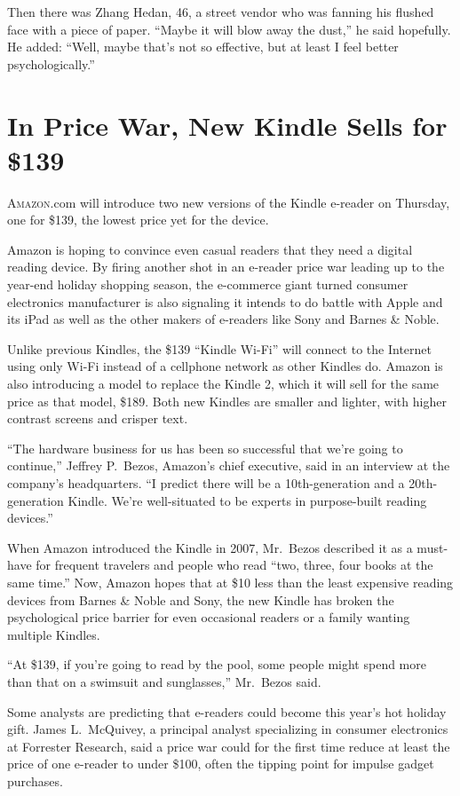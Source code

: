 ﻿\documentclass[12pt]{article}
\begin{document}
Then there was Zhang Hedan, 46, a street vendor who was fanning his flushed face with a piece of
paper. ``Maybe it will blow away the dust,'' he said hopefully. He added: ``Well, maybe that's not
so effective, but at least I feel better psychologically.''

\section{In Price War, New Kindle Sells for \$139}

\lettrine{A}{mazon}.com will introduce two new versions of the Kindle
e-reader on Thursday, one for \$139, the lowest price yet for the device.

Amazon is hoping to convince even casual readers that they need a digital reading device. By firing
another shot in an e-reader price war leading up to the year-end holiday shopping season, the
e-commerce giant turned consumer electronics manufacturer is also signaling it intends to do battle
with Apple and its iPad as well as the other makers of e-readers like Sony and Barnes \& Noble.

Unlike previous Kindles, the \$139 ``Kindle Wi-Fi'' will connect to the Internet using only Wi-Fi
instead of a cellphone network as other Kindles do. Amazon is also introducing a model to replace
the Kindle 2, which it will sell for the same price as that model, \$189. Both new Kindles are
smaller and lighter, with higher contrast screens and crisper text.

``The hardware business for us has been so successful that we're going to continue,'' Jeffrey
P.~Bezos, Amazon's chief executive, said in an interview at the company's headquarters. ``I predict
there will be a 10th-generation and a 20th-generation Kindle. We're well-situated to be experts in
purpose-built reading devices.''

When Amazon introduced the Kindle in 2007, Mr.~Bezos described it as a must-have for frequent
travelers and people who read ``two, three, four books at the same time.'' Now, Amazon hopes that at
\$10 less than the least expensive reading devices from Barnes \& Noble and Sony, the new Kindle has
broken the psychological price barrier for even occasional readers or a family wanting multiple
Kindles.

``At \$139, if you're going to read by the pool, some people might spend more than that on a
swimsuit and sunglasses,'' Mr.~Bezos said.

Some analysts are predicting that e-readers could become this year's hot holiday gift. James
L.~McQuivey, a principal analyst specializing in consumer electronics at Forrester Research, said a
price war could for the first time reduce at least the price of one e-reader to under \$100, often
the tipping point for impulse gadget purchases.
\end{document}

